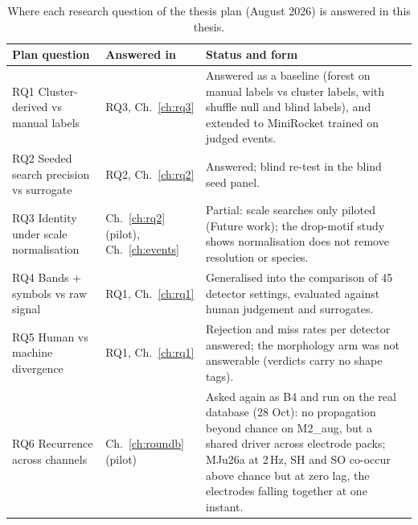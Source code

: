 \begin{table}[htbp]
\caption[{Where each research question of the thesis plan is answered.}]{Where each research question of the thesis plan (August 2026) is answered in this thesis.}
\label{tab:rqmap}
\small
\begin{tabularx}{\textwidth}{p{4.2cm} p{2.2cm} X}
\toprule
\textbf{Plan question} & \textbf{Answered in} & \textbf{Status and form}\\
\midrule
RQ1 Cluster-derived vs manual labels & RQ3, Ch.~\ref{ch:rq3} & Answered as a baseline (forest on manual labels vs cluster labels, with shuffle null and blind labels), and extended to MiniRocket trained on judged events.\\
\addlinespace
RQ2 Seeded search precision vs surrogate & RQ2, Ch.~\ref{ch:rq2} & Answered; blind re-test in the blind seed panel.\\
\addlinespace
RQ3 Identity under scale normalisation & Ch.~\ref{ch:rq2} (pilot), Ch.~\ref{ch:events} & Partial: scale searches only piloted (Future work); the drop-motif study shows normalisation does not remove resolution or species.\\
\addlinespace
RQ4 Bands + symbols vs raw signal & RQ1, Ch.~\ref{ch:rq1} & Generalised into the comparison of 45 detector settings, evaluated against human judgement and surrogates.\\
\addlinespace
RQ5 Human vs machine divergence & RQ1, Ch.~\ref{ch:rq1} & Rejection and miss rates per detector answered; the morphology arm was not answerable (verdicts carry no shape tags).\\
\addlinespace
RQ6 Recurrence across channels & Ch.~\ref{ch:roundb} (pilot) & Asked again as B4 and run on the real database (28 Oct): no propagation beyond chance on M2\_aug, but a shared driver across electrode packs; MJu26a at 2\,Hz, SH and SO co-occur above chance but at zero lag, the electrodes falling together at one instant.\\
\bottomrule
\end{tabularx}
\end{table}

